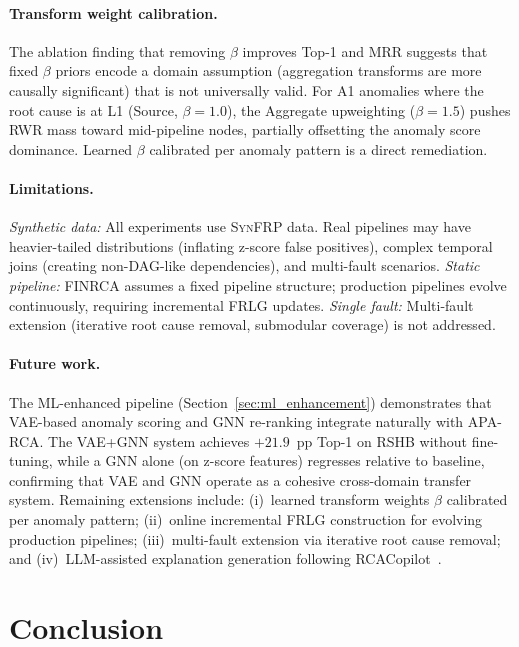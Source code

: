 \documentclass{article}
\newcommand{\finrca}{\textsc{FINRCA}}
\newcommand{\aparca}{\textsc{APA-RCA}}
\newcommand{\synfrp}{\textsc{SynFRP}}
\begin{document}
\paragraph{Transform weight calibration.}
The ablation finding that removing $\beta$ improves Top-1 and MRR suggests
that fixed $\beta$ priors encode a domain assumption (aggregation transforms
are more causally significant) that is not universally valid.
For A1 anomalies where the root cause is at L1 (Source, $\beta=1.0$), the
Aggregate upweighting ($\beta=1.5$) pushes RWR mass toward mid-pipeline nodes,
partially offsetting the anomaly score dominance.
Learned $\beta$ calibrated per anomaly pattern is a direct remediation.

\paragraph{Limitations.}
\textit{Synthetic data:} All experiments use \synfrp{} data.
Real pipelines may have heavier-tailed distributions (inflating z-score false
positives), complex temporal joins (creating non-DAG-like dependencies), and
multi-fault scenarios.
\textit{Static pipeline:} \finrca{} assumes a fixed pipeline structure;
production pipelines evolve continuously, requiring incremental FRLG updates.
\textit{Single fault:} Multi-fault extension (iterative root cause removal,
submodular coverage) is not addressed.

\paragraph{Future work.}
The ML-enhanced pipeline (Section~\ref{sec:ml_enhancement}) demonstrates that
VAE-based anomaly scoring and GNN re-ranking integrate naturally with \aparca{}.
The VAE+GNN system achieves $+21.9$~pp Top-1 on RSHB without fine-tuning,
while a GNN alone (on z-score features) regresses relative to baseline,
confirming that VAE and GNN operate as a cohesive cross-domain transfer system.
Remaining extensions include: (i)~learned transform weights $\beta$ calibrated
per anomaly pattern; (ii)~online incremental FRLG construction for evolving
production pipelines; (iii)~multi-fault extension via iterative root cause
removal; and (iv)~LLM-assisted explanation generation following
RCACopilot~\cite{chen2024rcacopilot}.

\section{Conclusion}
\label{sec:conclusion}
\end{document}
